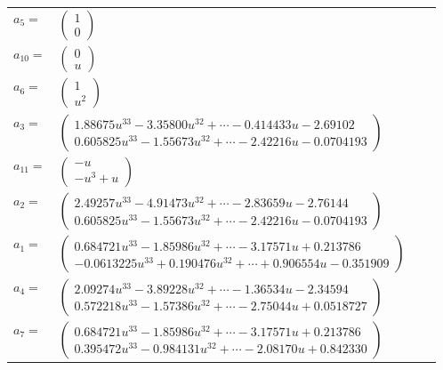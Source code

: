 \documentclass[1p]{elsarticle_modified}
\theoremstyle{definition}
\begin{document}
\begin{tabular}{m{7pt} m{180pt} m{7pt} m{180pt} }
\flushright $a_{5}=$&$\begin{pmatrix}1\\0\end{pmatrix}$ \\
\flushright $a_{10}=$&$\begin{pmatrix}0\\u\end{pmatrix}$ \\
\flushright $a_{6}=$&$\begin{pmatrix}1\\u^2\end{pmatrix}$ \\
\flushright $a_{3}=$&$\begin{pmatrix}1.88675 u^{33}-3.35800 u^{32}+\cdots-0.414433 u-2.69102\\0.605825 u^{33}-1.55673 u^{32}+\cdots-2.42216 u-0.0704193\end{pmatrix}$ \\
\flushright $a_{11}=$&$\begin{pmatrix}- u\\- u^3+u\end{pmatrix}$ \\
\flushright $a_{2}=$&$\begin{pmatrix}2.49257 u^{33}-4.91473 u^{32}+\cdots-2.83659 u-2.76144\\0.605825 u^{33}-1.55673 u^{32}+\cdots-2.42216 u-0.0704193\end{pmatrix}$ \\
\flushright $a_{1}=$&$\begin{pmatrix}0.684721 u^{33}-1.85986 u^{32}+\cdots-3.17571 u+0.213786\\-0.0613225 u^{33}+0.190476 u^{32}+\cdots+0.906554 u-0.351909\end{pmatrix}$ \\
\flushright $a_{4}=$&$\begin{pmatrix}2.09274 u^{33}-3.89228 u^{32}+\cdots-1.36534 u-2.34594\\0.572218 u^{33}-1.57386 u^{32}+\cdots-2.75044 u+0.0518727\end{pmatrix}$ \\
\flushright $a_{7}=$&$\begin{pmatrix}0.684721 u^{33}-1.85986 u^{32}+\cdots-3.17571 u+0.213786\\0.395472 u^{33}-0.984131 u^{32}+\cdots-2.08170 u+0.842330\end{pmatrix}$ \\

\end{tabular}
\end{document}
